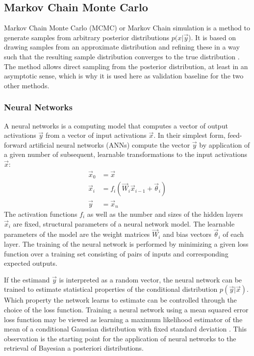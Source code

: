 \documentclass[journal abbreviation, manuscript]{copernicus}
\begin{document}
\subsection{Markov Chain Monte Carlo}

    Markov Chain Monte Carlo (MCMC) or Markov Chain simulation is a method
    to generate samples from arbitrary posterior distributions $p(x | \vec{y}$).
    It is based on drawing samples from an approximate distribution and
    refining these in a way such that the resulting sample distribution
    converges to the true distribution \citep{bda}. The method allows
    direct sampling from the posterior distribution, at least in an
    asymptotic sense, which is why it is used here as validation baseline
    for the two other methods.

\subsubsection{Neural Networks}

  A neural networks is a computing model that computes a vector of output
  activations $\vec{y}$ from a vector of input activations $\vec{x}$. In their
  simplest form, feed-forward artificial neural networks (ANNs) compute the
  vector $\vec{y}$ by application of a given number of subsequent, learnable
  transformations to the input activations $\vec{x}$:
    \begin{align}
        \vec{x}_0 &= \vec{x}\\
        \vec{x}_i &= f_{i}
        \left ( \vec{W}_{i} \vec{x}_{i - 1}+ \vec{\theta}_i \right ) \\
        \vec{y} &= \vec{x}_{n}
    \end{align}
    The activation functions $f_i$ as well as the number and sizes of the
    hidden layers $\vec{x}_i$ are fixed, structural parameters of a neural
    network model. The learnable parameters of the model are the weight
    matrices $\vec{W}_i$ and bias vectors $\vec{\theta}_i$ of each layer. The
    training of the neural network is performed by minimizing a given loss
    function over a training set consisting of pairs of inputs and corresponding
    expected outputs.

    If the estimand $\vec{y}$ is interpreted as a random vector, the neural
    network can be trained to estimate statistical properties of the conditional
    distribution $p(\vec{y} | \vec{x})$. Which property the network learns to
    estimate can be controlled through the choice of the loss function. Training a
    neural network using a mean squared error loss function may be viewed as
    learning a maximum likelihood estimator of the mean of a conditional
    Gaussian distribution with fixed standard deviation \citep{bishop_mdn}.
    This observation is the starting point for the application of neural networks
    to the retrieval of Bayesian a posteriori distributions.
\end{document}
